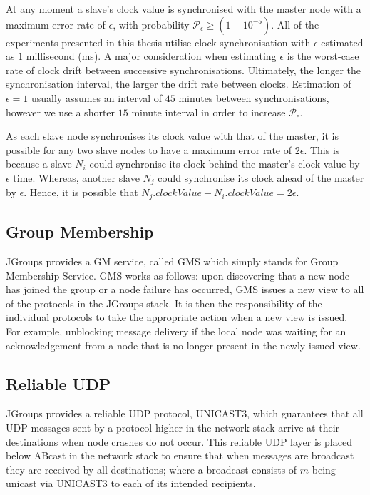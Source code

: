             At any moment a slave's clock value is synchronised with the master node with a maximum error rate of $\epsilon$, with probability $\mathcal{P}_\epsilon \geq (1- 10^{-5})$. All of the experiments presented in this thesis utilise clock synchronisation with $\epsilon$ estimated as $1$ millisecond (ms).  A major consideration when estimating $\epsilon$ is the worst-case rate of clock drift between successive synchronisations. Ultimately, the longer the synchronisation interval, the larger the drift rate between clocks.  Estimation of $\epsilon = 1$ usually assumes an interval of $45$ minutes between synchronisations, however we use a shorter $15$ minute interval in order to increase $\mathcal{P}_\epsilon$.
            
            As each slave node synchronises its clock value with that of the master, it is possible for any two slave nodes to have a maximum error rate of $2\epsilon$.  This is because a slave $N_i$ could synchronise its clock behind the master's clock value by $\epsilon$ time.  Whereas, another slave $N_j$ could synchronise its clock ahead of the master by $\epsilon$. Hence, it is possible that $N_j.clockValue - N_i.clockValue = 2\epsilon$.  

    \subsection{Group Membership}\label{ssec:jgroups_gm}
    JGroups provides a GM service, called GMS which simply stands for Group Membership Service. GMS works as follows: upon discovering that a new node has joined the group or a node failure has occurred, GMS issues a new view to all of the protocols in the JGroups stack.  It is then the responsibility of the individual protocols to take the appropriate action when a new view is issued.  For example, unblocking message delivery if the local node was waiting for an acknowledgement from a node that is no longer present in the newly issued view.     
    
    \subsection{Reliable UDP}\label{ssec:reliable_udp}
    JGroups provides a reliable UDP protocol, \textsf{UNICAST3}, which guarantees that all UDP messages sent by a protocol higher in the network stack arrive at their destinations when node crashes do not occur.  This reliable UDP layer is placed below \textsf{ABcast} in the network stack to ensure that when messages are broadcast they are received by all destinations; where a broadcast consists of $m$ being unicast via \textsf{UNICAST3} to each of its intended recipients.  
    
